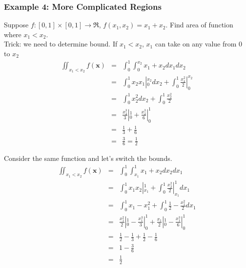 \documentclass{beamer}
\numberwithin{equation}{section}
\begin{document}
\begin{frame}
\frametitle{Example 4: More Complicated Regions}

Suppose $f:[0,1] \times [0,1] \rightarrow \Re$, $f(x_{1}, x_{2}) = x_{1} + x_{2} $.  Find area of function where $x_{1} < x_{2}$.  \\
\alert{Trick}: we need to determine bound.  If $x_{1}< x_{2}$, $x_{1}$ can take on any value from $0$ to $x_{2}$\\
\small
\begin{eqnarray}
\iint_{x_{1}< x_{2}}  f(\boldsymbol{x}) & = & \int_{0}^{1} \int_{0}^{x_{2}} x_{1} + x_{2} dx_{1} dx_{2} \nonumber \\
& = & \int_{0}^{1} x_{2} x_{1} |_{0}^{x_{2}} dx_{2}  + \int_{0}^{1} \frac{x_{1}^{2} }{2} |_{0}^{x_{2} } \nonumber \\
& = & \int_{0}^{1} x_{2}^{2} dx_{2}  + \int_{0}^{1} \frac{x_{2}^2}{2} \nonumber \\
& = & \frac{x_{2}^{3} }{3}|_{0}^{1} + \frac{x_{2}^{3}}{6}|_{0}^{1} \nonumber \\
& = & \frac{1}{3}  + \frac{1}{6} \nonumber \\
& = & \frac{3}{6} = \frac{1}{2} \nonumber 
\end{eqnarray}


\end{frame}

\begin{frame}
Consider the same function and let's switch the bounds. 
\begin{eqnarray}
\iint_{x_{1}<x_{2}} f(\boldsymbol{x}) & = & \int_{0}^{1} \int_{x_{1}}^{1} x_{1} + x_{2} dx_{2} dx_{1}\nonumber \\
													&  = & \int_{0}^{1} x_{1}x_{2}|_{x_{1}}^{1}  +  \int_{0}^{1} \frac{x_{2}^{2}}{2} |_{x_{1}}^{1}dx_{1} \nonumber \\
													& = & \int_{0}^{1} x_{1} - x_{1}^2 + \int_{0}^{1} \frac{1}{2} - \frac{x_{1}^2}{2} dx_{1} \nonumber \\
													& = &  \frac{x_{1}^2}{2}|_{0}^{1}  - \frac{x_{1}^{3}}{3}|_{0}^{1}  + \frac{x_{1}}{2}|_{0}^{1}  - \frac{x_{1}^{3}}{6}|_{0}^{1} \nonumber \\
													&= & \frac{1}{2}  - \frac{1}{3}  + \frac{1}{2} - \frac{1}{6} \nonumber \\
													& = & 1 - \frac{3}{6} \nonumber \\
													& = & \frac{1}{2} \nonumber 
\end{eqnarray}													


\end{frame}
\end{document}
